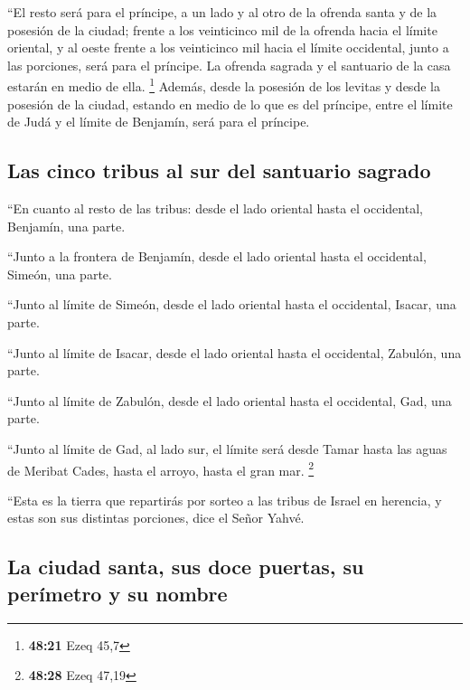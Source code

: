 \begin{paracol}{2}
 ``El resto será para el príncipe, a un lado y al otro de
la ofrenda santa y de la posesión de la ciudad; frente a los veinticinco
mil de la ofrenda hacia el límite oriental, y al oeste frente a los
veinticinco mil hacia el límite occidental, junto a las porciones, será
para el príncipe. La ofrenda sagrada y el santuario de la casa estarán
en medio de ella. \footnote{\textbf{48:21} Ezeq 45,7} 
Además, desde la posesión de los levitas y desde la posesión de la
ciudad, estando en medio de lo que es del príncipe, entre el límite de
Judá y el límite de Benjamín, será para el príncipe.

\hypertarget{las-cinco-tribus-al-sur-del-santuario-sagrado}{%
\subsection{Las cinco tribus al sur del santuario
sagrado}\label{las-cinco-tribus-al-sur-del-santuario-sagrado}}

 ``En cuanto al resto de las tribus: desde el lado
oriental hasta el occidental, Benjamín, una parte.

 ``Junto a la frontera de Benjamín, desde el lado
oriental hasta el occidental, Simeón, una parte.

 ``Junto al límite de Simeón, desde el lado oriental
hasta el occidental, Isacar, una parte.

 ``Junto al límite de Isacar, desde el lado oriental
hasta el occidental, Zabulón, una parte.

 ``Junto al límite de Zabulón, desde el lado oriental
hasta el occidental, Gad, una parte.

 ``Junto al límite de Gad, al lado sur, el límite será
desde Tamar hasta las aguas de Meribat Cades, hasta el arroyo, hasta el
gran mar. \footnote{\textbf{48:28} Ezeq 47,19}

 ``Esta es la tierra que repartirás por sorteo a las
tribus de Israel en herencia, y estas son sus distintas porciones, dice
el Señor Yahvé.

\hypertarget{la-ciudad-santa-sus-doce-puertas-su-peruxedmetro-y-su-nombre}{%
\subsection{La ciudad santa, sus doce puertas, su perímetro y su
nombre}\label{la-ciudad-santa-sus-doce-puertas-su-peruxedmetro-y-su-nombre}}


\end{paracol}
